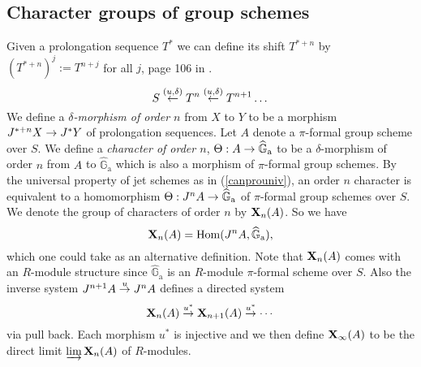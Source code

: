\documentclass{amsart}
\def \hG{\widehat{\mathbb{G}}_{\mathrm{a}}}
\numberwithin{equation}{section}
\newcommand{\Hom}{\mathrm{Hom}}
\def \d{\delta}
\begin{document}
\subsection{Character groups of group schemes}
Given a prolongation sequence $T^*$ we can define its shift $T^{*+n}$ by 
$(T^{*+n})^j:= T^{n+j}$ for all $j$, page 106 in \cite{MR1748272}.
	$$
	S \stk{(u,\d)}{\leftarrow} T^n \stk{(u,\d)}{\leftarrow} T^{n+1}\dots 
	$$
We define a {\it $\d$-morphism of order $n$} from $X$ to $Y$ to be a 
morphism $J^{*+n}X \rightarrow J^*Y$ of prolongation sequences.
Let $A$ denote a $\pi$-formal group scheme over $S$.
We define a {\it character of order $n$}, $\Theta:A \map \hG$ 
to be a $\d$-morphism of order $n$ from $A$ to $\hG$
which is also a morphism of $\pi$-formal group schemes.
By the universal property of jet schemes as in (\ref{canprouniv}),
 an order $n$ character is equivalent to a homomorphism
$\Theta:J^nA \map \hG$ of $\pi$-formal group schemes over $S$. 
We denote the group of 
characters of order $n$ by ${\bf X}_n(A)$. So we have
$$
	\bX_n(A)=\Hom(J^nA,\hG),
	$$
which one could take as an alternative definition. Note that ${\bf X}_n(A)$ comes with an
$R$-module structure since $\hG$ is an $R$-module $\pi$-formal scheme over $S$. Also the inverse system 
$J^{n+1}A \stackrel{u}{\rightarrow} J^nA$ defines a directed system
$$
	{\bf X}_n(A) \stackrel{u^*}{\rightarrow} {\bf X}_{n+1}(A) \stackrel{u^*}{\rightarrow}\cdots
	$$
via pull back. Each morphism $u^*$ is injective and 
we then define ${\bf X}_\infty(A)$ to be the direct limit $\varinjlim {\bf X}_n(A)$
of $R$-modules.
\end{document}
